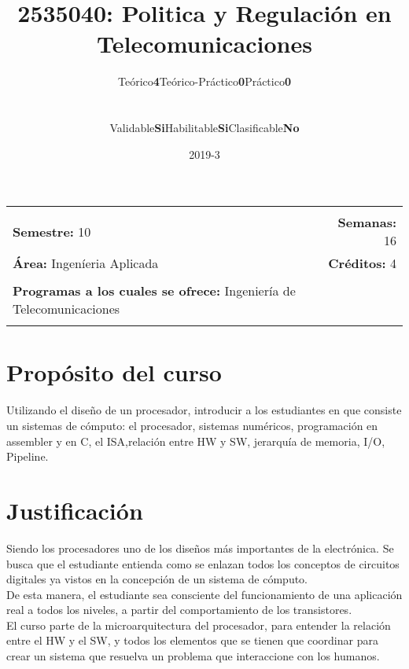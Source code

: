 \documentclass[11pt]{article}
\title{2535040: Politica y Regulación en Telecomunicaciones}
\author{\begin{tabular} {c|c|c|c|c|c} Teórico & \textbf{4} & Teórico-Práctico & \textbf{0} & Práctico & \textbf{0}\end{tabular}
\\
\begin{tabular} {c|c|c|c|c|c} Validable & \textbf{Si} & Habilitable & \textbf{Si} & Clasificable & \textbf{No}\end{tabular}}
\date{2019-3}
\newcommand{\blankline}{\quad\pagebreak[2]}
\begin{document}
\maketitle

\begin{tabular*}{.93\textwidth}{@{\extracolsep{\fill}}lr}
\hline\\

\textbf{Semestre:} 10 & \textbf{Semanas:} 16
\\
\textbf{Área:} Ingeníeria Aplicada &    \textbf{Créditos:} 4 
\\ & \\
\textbf{Programas a los cuales se ofrece:} Ingeniería de Telecomunicaciones
\\ & \\
\hline
\end{tabular*}

\vspace{5 mm}

\section*{Propósito del curso}

Utilizando el diseño de un procesador, introducir a los estudiantes en que consiste un sistemas de cómputo: el procesador, sistemas numéricos, programación en assembler y en C, el ISA,relación entre HW y SW, jerarquía de memoria, I/O, Pipeline.



\section*{Justificación}

Siendo los procesadores uno de los diseños más importantes de la electrónica. Se busca que el estudiante entienda como se enlazan todos los conceptos de circuitos digitales ya vistos en la concepción de un sistema de cómputo.
\\De esta manera, el estudiante sea consciente del funcionamiento de una aplicación real a todos los niveles, a partir del comportamiento de los transistores.
\\El curso parte de la microarquitectura del procesador, para entender la relación entre el HW y el SW, y todos los elementos que se tienen que coordinar para crear un sistema que resuelva un problema que interaccione con los humanos.
\end{document}
